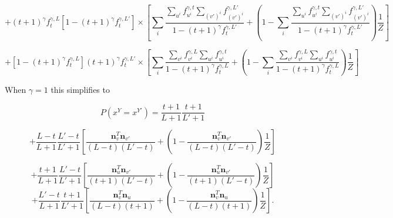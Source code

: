\documentclass{article}
\begin{document}
$$+(t+1)^\gamma f^{\gamma,L}_t[1-(t+1)^\gamma f^{\gamma,L'}_t] \times 
\left[
\sum_i \frac{\sum\limits_{u^i} f_{u^i}^{\gamma, t} \sum\limits_{(v')^i} f_{(v')^i}^{\gamma,L'}}{1 - (t+1)^\gamma f^{\gamma,L'}_t} 
+ \left(1 - \sum_i \frac{\sum\limits_{u^i} f_{u^i}^{\gamma, t} \sum\limits_{(v')^i} f_{(v')^i}^{\gamma,L'}}{1 - (t+1)^\gamma f^{\gamma,L'}_t}\right)\frac{1}{Z}
\right]
$$

$$+[1 - (t+1)^\gamma f^{\gamma,L}_t](t+1)^\gamma f^{\gamma,L'}_t \times \left[
\sum_i \frac{\sum\limits_{v^i} f_{v^i}^{\gamma,L}\sum\limits_{u^i} f_{u^i}^{\gamma, t}}{1 - (t+1)^\gamma f^{\gamma,L}_t} 
+ \left(1 - \sum_i \frac{\sum\limits_{v^i} f_{v^i}^{\gamma,L}\sum\limits_{u^i} f_{u^i}^{\gamma, t}}{1 - (t+1)^\gamma f^{\gamma,L}_t}\right)\frac{1}{Z}
\right]
$$

When $\gamma = 1$ this simplifies to

$$P(x^Y = x^{Y'}) =  \frac{t+1}{L+1}\frac{t+1}{L'+1}$$

$$
+ \frac{L-t}{L+1}\frac{L'-t}{L'+1}\left[\frac{\mathbf{n}^T_v\mathbf{n}_{v'}}{(L-t)(L'-t)} + \left(1 - \frac{\mathbf{n}^T_v\mathbf{n}_{v'}}{(L-t)(L'-t)} \right)\frac{1}{Z}\right]
$$

$$+\frac{t+1}{L+1}\frac{L'-t}{L'+1}\left[
\frac{\mathbf{n}^T_{u}\mathbf{n}_{v'}}{(t+1)(L'-t)}+ \left(1 - \frac{\mathbf{n}^T_{u}\mathbf{n}_{v'}}{(t+1)(L'-t)} \right)\frac{1}{Z}
\right]$$
$$
+\frac{L'-t}{L+1}\frac{t+1}{L'+1}\left[
\frac{\mathbf{n}^T_{v}\mathbf{n}_{u}}{(L-t)(t+1)} + \left(1 - \frac{\mathbf{n}^T_{v}\mathbf{n}_{u}}{(L-t)(t+1)} \right)\frac{1}{Z}
\right].
$$
\end{document}
